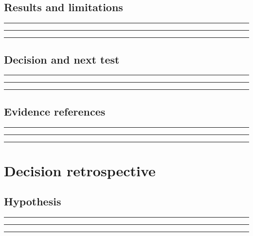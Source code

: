 \documentclass[11pt]{article}
\begin{document}
\subsection{Results and limitations}
\noindent\rule{\linewidth}{0.35pt}\par\vspace{0.22in}
\noindent\rule{\linewidth}{0.35pt}\par\vspace{0.22in}
\noindent\rule{\linewidth}{0.35pt}\par\vspace{0.18in}

\subsection{Decision and next test}
\noindent\rule{\linewidth}{0.35pt}\par\vspace{0.22in}
\noindent\rule{\linewidth}{0.35pt}\par\vspace{0.22in}
\noindent\rule{\linewidth}{0.35pt}\par\vspace{0.18in}

\subsection{Evidence references}
\noindent\rule{\linewidth}{0.35pt}\par\vspace{0.22in}
\noindent\rule{\linewidth}{0.35pt}\par\vspace{0.22in}
\noindent\rule{\linewidth}{0.35pt}\par\vspace{0.18in}
\clearpage

\section{Decision retrospective}

\subsection{Hypothesis}
\noindent\rule{\linewidth}{0.35pt}\par\vspace{0.22in}
\noindent\rule{\linewidth}{0.35pt}\par\vspace{0.22in}
\noindent\rule{\linewidth}{0.35pt}\par\vspace{0.18in}
\end{document}
